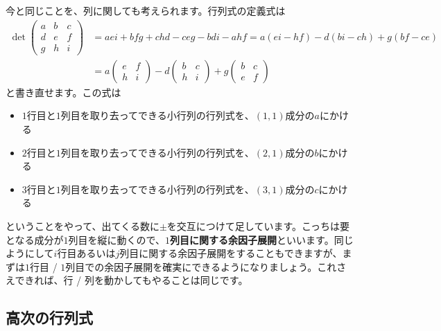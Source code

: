 今と同じことを、列に関しても考えられます。行列式の定義式は
\begin{align*}
\det
\begin{pmatrix}
a & b & c \\
d & e & f \\
g & h & i
\end{pmatrix}
&=  aei + bfg + chd - ceg - bdi - ahf
= a(ei - hf) - d(bi - ch) + g(bf - ce) \\
&=
a
\begin{pmatrix}
e & f \\
h & i
\end{pmatrix}
- d
\begin{pmatrix}
b & c \\
h & i
\end{pmatrix}
+ g
\begin{pmatrix}
b & c \\
e & f
\end{pmatrix}
\end{align*}
と書き直せます。この式は
\begin{itemize}
\item $1$行目と$1$列目を取り去ってできる小行列の行列式を、$(1, 1)$成分の$a$にかける
\item $2$行目と$1$列目を取り去ってできる小行列の行列式を、$(2, 1)$成分の$b$にかける
\item $3$行目と$1$列目を取り去ってできる小行列の行列式を、$(3, 1)$成分の$c$にかける
\end{itemize}
ということをやって、出てくる数に$\pm$を交互につけて足しています。こっちは要となる成分が$1$列目を縦に動くので、\textbf{$1$列目に関する余因子展開}といいます。同じようにして$i$行目あるいは$j$列目に関する余因子展開をすることもできますが、まずは$1$行目 / $1$列目での余因子展開を確実にできるようになりましょう。これさえできれば、行 / 列を動かしてもやることは同じです。

\subsection{高次の行列式}


